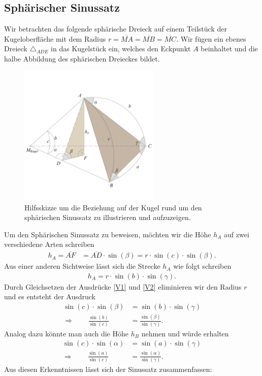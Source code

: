 \begin{refsection}
\subsection{Sphärischer Sinussatz}
Wir betrachten das folgende sphärische Dreieck auf einem Teilstück der Kugeloberfläche mit dem Radius $r= \overline{MA} = \overline{MB} = \overline{MC}$. Wir fügen ein ebenes Dreieck $\triangle_{ADE}$ in das Kugelstück ein, welches den Eckpunkt $A$ beinhaltet und die halbe Abbildung des sphärischen Dreieckes bildet.

\begin{figure}[hbtp]
\centering
\includegraphics[width=0.6\textwidth]{kugel/Sinussatz.jpg}
\caption{Hilfsskizze um die Beziehung auf der Kugel rund um den sphärischen Sinussatz zu illustrieren und aufzuzeigen.}
\end{figure}

Um den Sphärischen Sinussatz zu beweisen, möchten wir die Höhe $h_{A}$ auf zwei verschiedene Arten schreiben
\begin{align}
h_{A} = \overline{AF} &= \overline{AD} \cdot \sin(\beta) = r \cdot \sin(c) \cdot \sin(\beta).  
\label {V1}
\end{align}
Aus einer anderen Sichtweise lässt sich die Strecke $h_{A}$ wie folgt schreiben
\begin{align}
h_{A} = r \cdot \sin(b) \cdot \sin(\gamma).  
\label {V2}
\end{align}
Durch Gleichsetzen der Ausdrücke \eqref{V1} und \eqref{V2} eliminieren wir den Radius $r$ und es entsteht der Ausdruck
\begin{align*}
\sin(c) \cdot \sin(\beta) &= \sin(b) \cdot \sin(\gamma) \\
\Rightarrow \quad \quad
\frac{\sin (b)}{\sin (c)} &= \frac{\sin (\beta)}{\sin (\gamma)}.
\end{align*}
Analog dazu könnte man auch die Höhe $h_{B}$ nehmen und würde erhalten
\begin{align*}
\sin(c) \cdot \sin(\alpha) &= \sin(a) \cdot \sin(\gamma) \\
\Rightarrow \quad \quad
\frac{\sin (a)}{\sin (c)} &= \frac{\sin (\alpha)}{\sin (\gamma)}.
\end{align*}
Aus diesen Erkenntnissen lässt sich der Sinussatz zusammenfassen:


\end{refsection}
